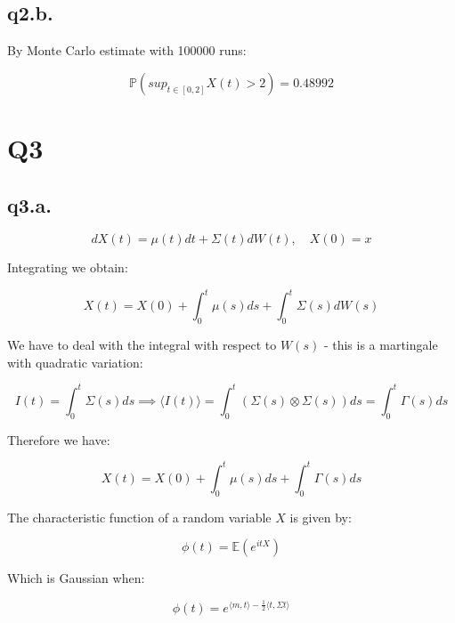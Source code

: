 \documentclass[11pt]{article} %
\begin{document}
\subsection{q2.b.}
By Monte Carlo estimate with 100000 runs:

\begin{equation}
	\mathbb{P}\left( sup_{t \in [0,2]} X(t) > 2 \right) = 0.48992
\end{equation}

\section{Q3}
\subsection{q3.a.}

\begin{equation}
	dX(t) = \mu(t)dt + \Sigma(t)dW(t), \quad X(0) = x
\end{equation}

Integrating we obtain:

\begin{equation}
	X(t) = X(0) + \int^{t}_{0}\mu(s)ds + \int^{t}_{0}\Sigma(s)dW(s)
\end{equation}

We have to deal with the integral with respect to $W(s)$ - this is a martingale with quadratic variation:

\begin{equation}
	I(t) = \int^{t}_{0}\Sigma(s)ds \implies \langle I(t) \rangle = \int^{t}_{0}(\Sigma(s) \otimes \Sigma(s))ds = \int^{t}_{0}\Gamma(s)ds
\end{equation}

Therefore we have:

\begin{equation}
	X(t) = X(0) + \int^{t}_{0}\mu(s)ds + \int^{t}_{0}\Gamma(s)ds
\end{equation}

The characteristic function of a random variable $X$ is given by:

\begin{equation}
	\phi(t) = \mathbb{E}(e^{itX})
\end{equation}

Which is Gaussian when:

\begin{equation}
	\phi(t) = e^{\langle m, t\rangle - \frac{1}{2}\langle t, \Sigma t\rangle}
\end{equation}
\end{document}
